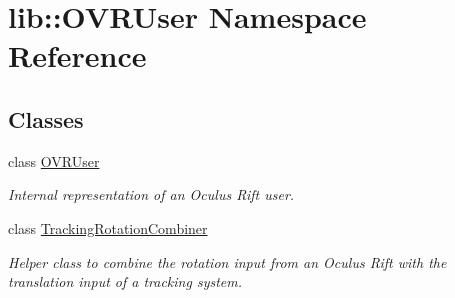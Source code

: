 \hypertarget{namespacelib_1_1OVRUser}{\section{lib\-:\-:\-O\-V\-R\-User \-Namespace \-Reference}
\label{namespacelib_1_1OVRUser}
}
\subsection*{\-Classes}
\begin{DoxyCompactItemize}
\item 
class \hyperlink{classlib_1_1OVRUser_1_1OVRUser}{\-O\-V\-R\-User}
\begin{DoxyCompactList}\small\item\em \-Internal representation of an \-Oculus \-Rift user. \end{DoxyCompactList}\item 
class \hyperlink{classlib_1_1OVRUser_1_1TrackingRotationCombiner}{\-Tracking\-Rotation\-Combiner}
\begin{DoxyCompactList}\small\item\em \-Helper class to combine the rotation input from an \-Oculus \-Rift with the translation input of a tracking system. \end{DoxyCompactList}\end{DoxyCompactItemize}
